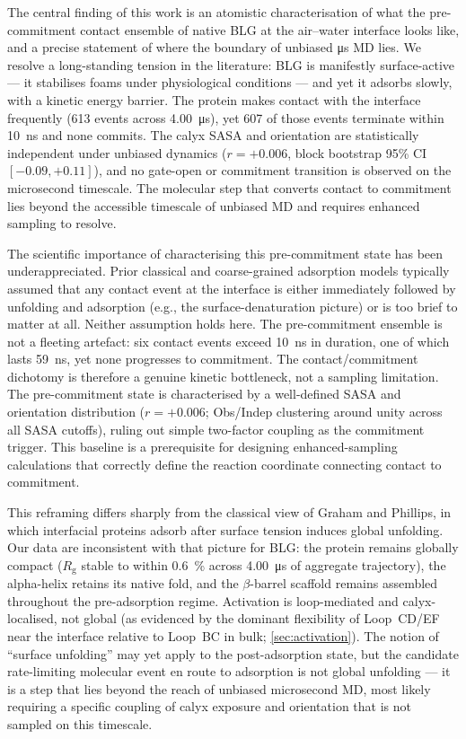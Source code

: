 \documentclass[11pt,a4paper]{article}
\begin{document}
The central finding of this work is an atomistic characterisation of
what the pre-commitment contact ensemble of native BLG at the air--water
interface looks like, and a precise statement of where the boundary of
unbiased \si{\micro\second} MD lies. We resolve a long-standing tension
in the literature: BLG is manifestly surface-active --- it stabilises
foams under physiological conditions --- and yet it adsorbs slowly, with
a kinetic energy barrier\citep{Cornec1999}. The protein makes contact
with the interface frequently (\num{613} events across
\SI{4.00}{\micro\second}), yet \num{607} of those events terminate
within \SI{10}{\nano\second} and none commits. The calyx SASA and
orientation are statistically independent under unbiased dynamics
($r = +0.006$, block bootstrap 95\% CI $[-0.09, +0.11]$), and no gate-open or commitment transition
is observed on the microsecond timescale. The molecular step that
converts contact to commitment lies beyond the accessible timescale of
unbiased MD and requires enhanced sampling to resolve.

The scientific importance of characterising this pre-commitment state
has been underappreciated. Prior classical and coarse-grained adsorption
models typically assumed that any contact event at the interface is
either immediately followed by unfolding and adsorption (e.g., the
surface-denaturation picture\citep{Graham1979}) or is too brief to
matter at all. Neither assumption holds here. The pre-commitment
ensemble is not a fleeting artefact: six contact events exceed
\SI{10}{\nano\second} in duration, one of which lasts \SI{59}{\nano\second},
yet none progresses to commitment. The contact/commitment dichotomy is
therefore a genuine kinetic bottleneck, not a sampling limitation.
The pre-commitment state is characterised by a well-defined SASA and
orientation distribution ($r = +0.006$; Obs/Indep clustering around
unity across all SASA cutoffs), ruling out simple two-factor coupling
as the commitment trigger. This baseline is a prerequisite for
designing enhanced-sampling calculations that correctly define the
reaction coordinate connecting contact to commitment.

This reframing differs sharply from the classical view of Graham and
Phillips, in which interfacial proteins adsorb after surface tension
induces global unfolding\citep{Graham1979}. Our data are inconsistent
with that picture for BLG: the protein remains globally compact
($R_\mathrm{g}$ stable to within \SI{0.6}{\percent} across
\SI{4.00}{\micro\second} of aggregate trajectory), the alpha-helix retains its native fold, and the
$\beta$-barrel scaffold remains assembled throughout the pre-adsorption
regime. Activation is loop-mediated and calyx-localised, not global (as
evidenced by the dominant flexibility of Loop~CD/EF near the
interface relative to Loop~BC in bulk; \cref{sec:activation}). The
notion of ``surface unfolding'' may yet apply to the post-adsorption
state, but the candidate rate-limiting molecular event en route to adsorption is
not global unfolding --- it is a step that lies beyond the reach of
unbiased microsecond MD, most likely requiring a specific coupling of
calyx exposure and orientation that is not sampled on this timescale.
\end{document}
